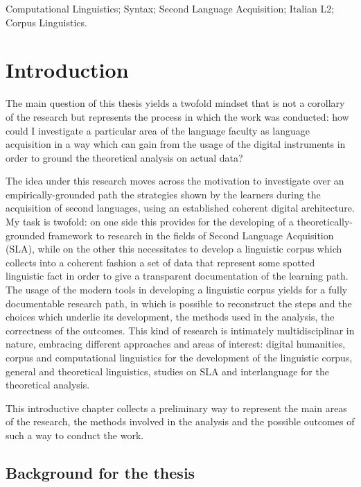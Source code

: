 \documentclass[
  a4paper,
  twoside,
  12pt,
  chapterprefix=false,
  bibliography=totocnumbered,
  listof=flat]{scrbook}
\begin{document}
Computational Linguistics; Syntax; Second Language Acquisition; Italian L2; Corpus Linguistics.

\mainmatter

\hypertarget{introduction}{%
\chapter{Introduction}\label{introduction}}

The main question of this thesis yields a twofold mindset that is not a corollary of the research but represents the process in which the work was conducted: how could I investigate a particular area of the language faculty as language acquisition in a way which can gain from the usage of the digital instruments in order to ground the theoretical analysis on actual data?

The idea under this research moves across the motivation to investigate over an empirically-grounded path the strategies shown by the learners during the acquisition of second languages, using an established coherent digital architecture.
My task is twofold: on one side this provides for the developing of a theoretically-grounded framework to research in the fields of Second Language Acquisition (SLA), while on the other this necessitates to develop a linguistic corpus which collects into a coherent fashion a set of data that represent some spotted linguistic fact in order to give a transparent documentation of the learning path.
The usage of the modern tools in developing a linguistic corpus yields for a fully documentable research path, in which is possible to reconstruct the steps and the choices which underlie its development, the methods used in the analysis, the correctness of the outcomes.
This kind of research is intimately multidisciplinar in nature, embracing different approaches and areas of interest: digital humanities, corpus and computational linguistics for the development of the linguistic corpus, general and theoretical linguistics, studies on SLA and interlanguage for the theoretical analysis.

This introductive chapter collects a preliminary way to represent the main areas of the research, the methods involved in the analysis and the possible outcomes of such a way to conduct the work.

\hypertarget{background-for-the-thesis}{%
\section{Background for the thesis}\label{background-for-the-thesis}}
\end{document}
